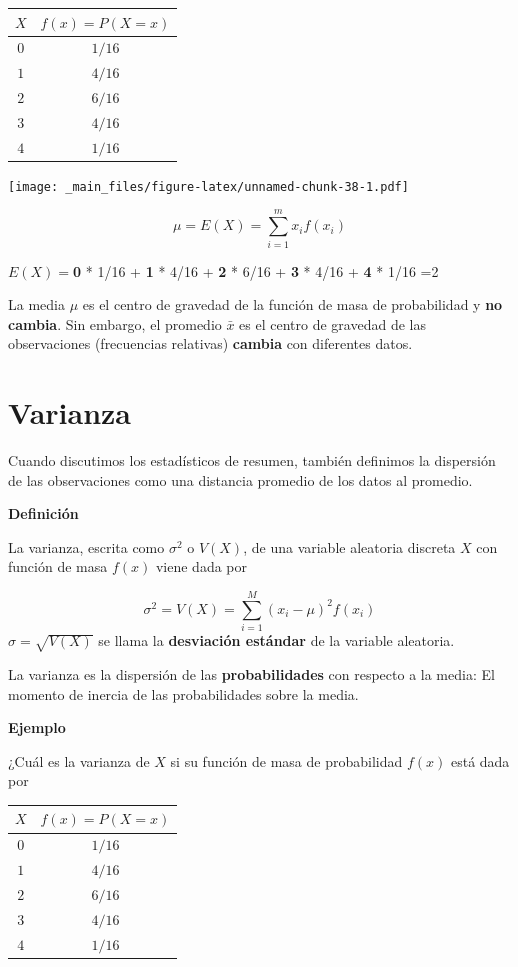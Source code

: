 \documentclass[
]{book}
\begin{document}
\begin{longtable}[]{@{}cc@{}}
\toprule\noalign{}
\(X\) & \(f(x)=P(X=x)\) \\
\midrule\noalign{}
\endhead
\bottomrule\noalign{}
\endlastfoot
\(0\) & \(1/16\) \\
\(1\) & \(4/16\) \\
\(2\) & \(6/16\) \\
\(3\) & \(4/16\) \\
\(4\) & \(1/16\) \\
\end{longtable}

\texttt{[image: \_main\_files/figure-latex/unnamed-chunk-38-1.pdf]}

\[ \mu =E(X)=\sum_{i=1}^m x_i f(x_i) \]

\(E(X)=\)\textbf{0} * 1/16 + \textbf{1} * 4/16 + \textbf{2} * 6/16 + \textbf{3} * 4/16 + \textbf{4} * 1/16 =2

La media \(\mu\) es el centro de gravedad de la función de masa de probabilidad y \textbf{no cambia}. Sin embargo, el promedio \(\bar{x}\) es el centro de gravedad de las observaciones (frecuencias relativas) \textbf{cambia} con diferentes datos.

\hypertarget{varianza}{%
\section{Varianza}\label{varianza}}

Cuando discutimos los estadísticos de resumen, también definimos la dispersión de las observaciones como una distancia promedio de los datos al promedio.

\textbf{Definición}

La varianza, escrita como \(\sigma^2\) o \(V(X)\), de una variable aleatoria discreta \(X\) con función de masa \(f(x)\) viene dada por

\[\sigma^2 = V(X)= \sum_{i=1}^M (x_i-\mu)^2 f(x_i)\]
\(\sigma=\sqrt{V(X)}\) se llama la \textbf{desviación estándar} de la variable aleatoria.

La varianza es la dispersión de las \textbf{probabilidades} con respecto a la media: El momento de inercia de las probabilidades sobre la media.

\textbf{Ejemplo}

¿Cuál es la varianza de \(X\) si su función de masa de probabilidad \(f(x)\) está dada por

\begin{longtable}[]{@{}cc@{}}
\toprule\noalign{}
\(X\) & \(f(x)=P(X=x)\) \\
\midrule\noalign{}
\endhead
\bottomrule\noalign{}
\endlastfoot
\(0\) & \(1/16\) \\
\(1\) & \(4/16\) \\
\(2\) & \(6/16\) \\
\(3\) & \(4/16\) \\
\(4\) & \(1/16\) \\
\end{longtable}
\end{document}
